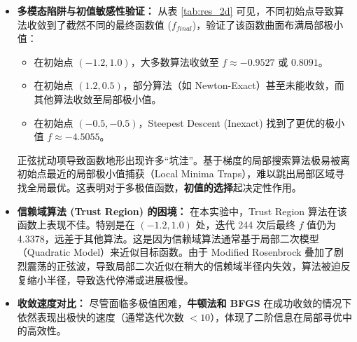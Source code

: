 \documentclass[a4paper,12pt]{article}
\begin{document}
\begin{itemize}
    \item \textbf{多模态陷阱与初值敏感性验证：}
    从表 \ref{tab:res_2d} 可见，不同初始点导致算法收敛到了截然不同的最终函数值 ($f_{final}$)，验证了该函数曲面布满局部极小值：
    \begin{itemize}
        \item 在初始点 $(-1.2, 1.0)$，大多数算法收敛至 $f \approx -0.9527$ 或 $0.8091$。
        \item 在初始点 $(1.2, 0.5)$，部分算法（如 Newton-Exact）甚至未能收敛，而其他算法收敛至局部极小值。
        \item 在初始点 $(-0.5, -0.5)$，Steepest Descent (Inexact) 找到了更优的极小值 $f \approx -4.5055$。
    \end{itemize}
    
    正弦扰动项导致函数地形出现许多“坑洼”。基于梯度的局部搜索算法极易被离初始点最近的局部极小值捕获（Local Minima Traps），难以跳出局部区域寻找全局最优。这表明对于多极值函数，\textbf{初值的选择}起决定性作用。
    
    \item \textbf{信赖域算法 (Trust Region) 的困境：}
    在本实验中，Trust Region 算法在该函数上表现不佳。特别是在 $(-1.2, 1.0)$ 处，迭代 244 次后最终 $f$ 值仍为 4.3378，远差于其他算法。这是因为信赖域算法通常基于局部二次模型（Quadratic Model）来近似目标函数。由于 Modified Rosenbrock 叠加了剧烈震荡的正弦波，导致局部二次近似在稍大的信赖域半径内失效，算法被迫反复缩小半径，导致迭代停滞或进展极慢。
    \item \textbf{收敛速度对比：}
    尽管面临多极值困难，\textbf{牛顿法和 BFGS} 在成功收敛的情况下依然表现出极快的速度（通常迭代次数 $< 10$），体现了二阶信息在局部寻优中的高效性。
\end{itemize}
\end{document}
